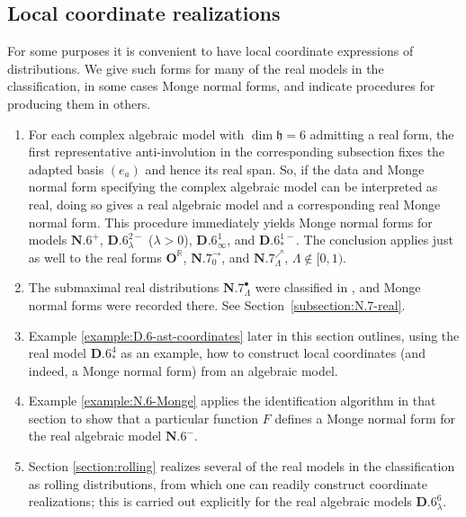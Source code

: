 \documentclass[pdftex]{sigma}
\newcommand{\bbR}{\mathbb{R}}
\newcommand{\mbD}{\mathbf{D}}
\newcommand{\mbO}{\mathbf{O}}
\newcommand{\mfh} {\mathfrak{h}}
\newcommand{\mfso} {\mathfrak{so}}
\numberwithin{equation}{section}
\begin{document}
\subsection{Local coordinate realizations}
For some purposes it is convenient to have local coordinate expressions of distributions. We give such forms for many of the real models in the classification, in some cases Monge normal forms, and indicate procedures for producing them in others.
\begin{enumerate}\itemsep=0pt
	\item For each complex algebraic model with $\dim \mfh = 6$ admitting a real form, the first representative anti-involution in the corresponding subsection fixes the adapted basis $(e_a)$ and hence its real span. So, if the data and Monge normal form specifying the complex algebraic model can be interpreted as real, doing so gives a real algebraic model and a corresponding real Monge normal form. This procedure immediately yields Monge normal forms for models $\mathbf{N.6}^+$, $\mathbf{D.6}_\lambda^{2-}$ ($\lambda > 0$), $\mathbf{D.6}_\infty^1$, and $\mathbf{D.6}_\ast^{1-}$. The conclusion applies just as well to the real forms $\mbO^{\bbR}$, $\mathbf{N.7}_0^{\rightarrow}$, and $\mathbf{N.7}_\Lambda^\nearrow$, $\Lambda \not\in [0, 1)$.
	\item The submaximal real distributions $\mathbf{N.7}_\Lambda^\bullet$ were classified in \cite{DoubrovKruglikov}, and Monge normal forms were recorded there. See Section~\ref{subsection:N.7-real}.
	\item Example \ref{example:D.6-ast-coordinates} later in this section outlines, using the real model $\mathbf{D.6}_{\ast}^4$ as an example, how to construct local coordinates (and indeed, a Monge normal form) from an algebraic model.
	\item Example \ref{example:N.6-Monge} applies the identification algorithm in that section to show that a particular function $F$ defines a Monge normal form for the real algebraic model $\mathbf{N.6}^-$.
	\item Section \ref{section:rolling} realizes several of the real models in the classification as rolling distributions, from which one can readily construct coordinate realizations; this is carried out explicitly for the real algebraic models $\mathbf{D.6}_{\lambda}^6$.
\end{enumerate}

\end{document}
